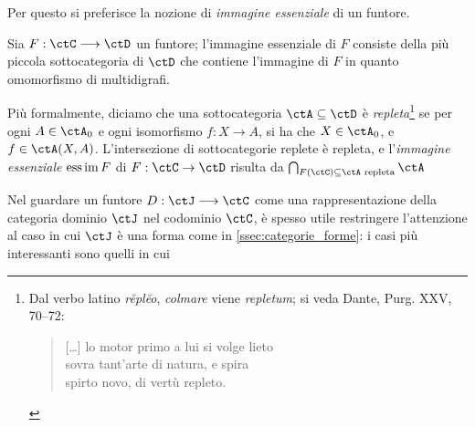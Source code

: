 Per questo si preferisce la nozione di \emph{immagine essenziale} di un funtore.
\begin{definition}\label{def_fun_imess}
	Sia \(F : \ctC\fun\ctD\) un funtore; l'immagine essenziale di \(F\) consiste della più piccola sottocategoria di \(\ctD\) che contiene l'immagine di \(F\) in quanto omomorfismo di multidigrafi.

	Più formalmente, diciamo che una sottocategoria \(\ctA\subseteq\ctD\) è \emph{repleta}\footnote{Dal verbo latino \emph{rĕplĕo}, \emph{colmare} viene \emph{repletum}; si veda Dante, Purg. XXV, 70--72:
		\begin{verse}
			[\dots\unkern] lo motor primo a lui si volge lieto \\
			sovra tant'arte di natura, e spira \\
			spirto novo, di vertù repleto.
		\end{verse}} se per ogni \(A\in\ctA_0\) e ogni isomorfismo \(f : X\to A\), si ha che \(X\in\ctA_0\), e \(f \in \Hom\ctA(X,A)\). L'intersezione di sottocategorie replete è repleta, e l'\emph{immagine essenziale} \(\operatorname*{ess\,im} F\) di \(F : \ctC\to\ctD\) risulta da \(\bigcap_{F(\ctC)\subseteq \ctA \text{ repleta}} \ctA\)
\end{definition}
Nel guardare un funtore \(D : \ctJ \fun\ctC\) come una rappresentazione della categoria dominio \(\ctJ\) nel codominio \(\ctC\), è spesso utile restringere l'attenzione al caso in cui \(\ctJ\) è una forma come in \ref{ssec:categorie_forme}: i casi più interessanti sono quelli in cui
